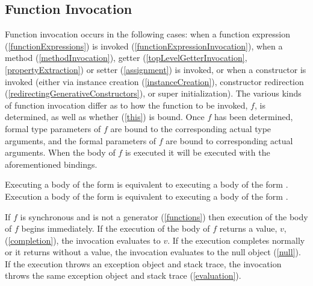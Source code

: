 \documentclass[makeidx]{article}
\begin{document}
\subsection{Function Invocation}

\LMHash{}%
Function invocation occurs in the following cases:
when a function expression (\ref{functionExpressions}) is invoked (\ref{functionExpressionInvocation}),
when a method (\ref{methodInvocation}), getter (\ref{topLevelGetterInvocation}, \ref{propertyExtraction}) or setter (\ref{assignment}) is invoked,
or when a constructor is invoked
(either via instance creation (\ref{instanceCreation}), constructor redirection (\ref{redirectingGenerativeConstructors}), or super initialization).
The various kinds of function invocation differ as to how the function to be invoked, $f$, is determined, as well as whether \THIS{} (\ref{this}) is bound.
Once $f$ has been determined,
formal type parameters of $f$ are bound to the corresponding actual type arguments,
and the formal parameters of $f$ are bound to corresponding actual arguments.
When the body of $f$ is executed it will be executed with the aforementioned bindings.

\LMHash{}%
Executing a body of the form  is equivalent to executing a body of the form .
Execution a body of the form  is equivalent to executing a body of the form .

\LMHash{}%
If $f$ is synchronous and is not a generator (\ref{functions}) then execution of the body of $f$ begins immediately.
If the execution of the body of $f$ returns a value, $v$, (\ref{completion}), the invocation evaluates to $v$.
If the execution completes normally or it returns without a value, the invocation evaluates to the null object (\ref{null}).
If the execution throws an exception object and stack trace, the invocation throws the same exception object and stack trace (\ref{evaluation}).

\end{document}
